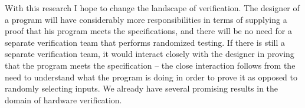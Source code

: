 \documentclass{article}
\begin{document}
With this research I hope to change the landscape of verification. The designer
of a program will have considerably more responsibilities in terms of supplying
a proof that his program meets the specifications, and there will be no need
for a separate verification team that performs randomized testing. If there is
still a separate verification team, it would interact closely with the designer
in proving that the program meets the specification -- the close interaction
follows from the need to understand what the program is doing in order to prove
it as opposed to randomly selecting inputs. We already have several promising
results in the domain of hardware verification.
\end{document}
